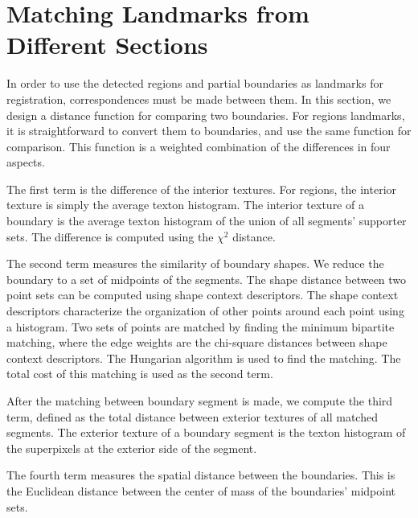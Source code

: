 \documentclass{llncs}
\begin{document}
\section{Matching Landmarks from Different Sections}

In order to use the detected regions and partial boundaries as landmarks for registration, correspondences must be made between them. In this section, we design a distance function for comparing two boundaries. For regions landmarks, it is straightforward to convert them to boundaries, and use the same function for comparison. This function is a weighted combination of the differences in four aspects.

The first term is the difference of the interior textures. For regions, the interior texture is simply the average texton histogram. The interior texture of a boundary is the average texton histogram of the union of all segments' supporter sets. The difference is computed using the $\chi^2$ distance.

The second term measures the similarity of boundary shapes. We reduce the boundary to a set of midpoints of the segments. The shape distance between two point sets can be computed using shape context descriptors. The shape context descriptors characterize the organization of other points around each point using a histogram. Two sets of points are matched by finding the minimum bipartite matching, where the edge weights are the chi-square distances between shape context descriptors. The Hungarian algorithm is used to find the matching. The total cost of this matching is used as the second term.

After the matching between boundary segment is made, we compute the third term, defined as the total distance between exterior textures of all matched segments. The exterior texture of a boundary segment is the texton histogram of the superpixels at the exterior side of the segment.

The fourth term measures the spatial distance between the boundaries. This is the Euclidean distance between the center of mass of the boundaries' midpoint sets.


\end{document}
